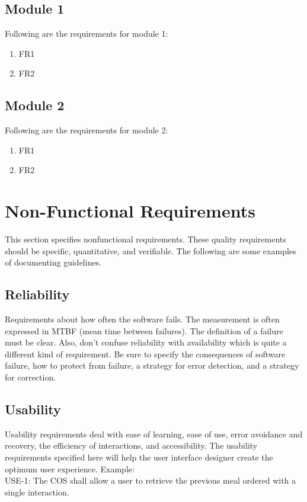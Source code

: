 \subsection{Module 1}
Following are the requirements for module 1:
\begin{enumerate}
    \item FR1
    \item FR2
\end{enumerate}

\subsection{Module 2}
Following are the requirements for module 2:
\begin{enumerate}
    \item FR1
    \item FR2
\end{enumerate}

\section{Non-Functional Requirements}
This section specifies nonfunctional requirements. These quality requirements should be specific, quantitative, and verifiable. The following are some examples of documenting guidelines.

\subsection{Reliability}
Requirements about how often the software fails. The measurement is often expressed in MTBF (mean time between failures). The definition of a failure must be clear. Also, don't confuse reliability with availability which is quite a different kind of requirement.  Be sure to specify the consequences of software failure, how to protect from failure, a strategy for error detection, and a strategy for correction.

\subsection{Usability}
Usability requirements deal with ease of learning, ease of use, error avoidance and recovery, the efficiency of interactions, and accessibility. The usability requirements specified here will help the user interface designer create the optimum user experience.
Example:\\

USE-1: The COS shall allow a user to retrieve the previous meal ordered with a single interaction.

